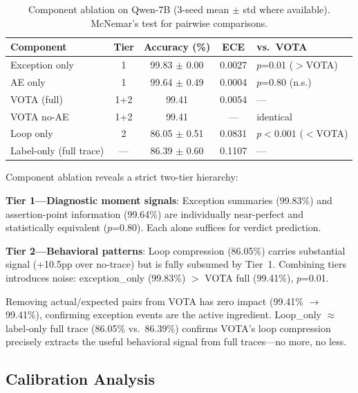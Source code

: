 \documentclass[11pt]{article}
\begin{document}
\begin{table}[h]
\centering
\caption{Component ablation on Qwen-7B (3-seed mean $\pm$ std where available). McNemar's test for pairwise comparisons.}
\label{tab:ablation}
\small
\begin{tabular}{lcccl}
\toprule
\textbf{Component} & \textbf{Tier} & \textbf{Accuracy (\%)} & \textbf{ECE} & \textbf{vs.\ VOTA} \\
\midrule
Exception only & 1 & 99.83 $\pm$ 0.00 & 0.0027 & $p$=0.01 ($>$VOTA) \\
AE only & 1 & 99.64 $\pm$ 0.49 & 0.0004 & $p$=0.80 (n.s.) \\
VOTA (full) & 1+2 & 99.41 & 0.0054 & --- \\
VOTA no-AE & 1+2 & 99.41 & --- & identical \\
Loop only & 2 & 86.05 $\pm$ 0.51 & 0.0831 & $p < 0.001$ ($<$VOTA) \\
Label-only (full trace) & --- & 86.39 $\pm$ 0.60 & 0.1107 & --- \\
\bottomrule
\end{tabular}
\end{table}

Component ablation reveals a strict two-tier hierarchy:

\textbf{Tier 1---Diagnostic moment signals}: Exception summaries (99.83\%) and assertion-point information (99.64\%) are individually near-perfect and statistically equivalent ($p$=0.80). Each alone suffices for verdict prediction.

\textbf{Tier 2---Behavioral patterns}: Loop compression (86.05\%) carries substantial signal (+10.5pp over no-trace) but is fully subsumed by Tier~1. Combining tiers introduces noise: exception\_only (99.83\%) $>$ VOTA full (99.41\%), $p$=0.01.

Removing actual/expected pairs from VOTA has zero impact (99.41\% $\rightarrow$ 99.41\%), confirming exception events are the active ingredient. Loop\_only $\approx$ label-only full trace (86.05\% vs.\ 86.39\%) confirms VOTA's loop compression precisely extracts the useful behavioral signal from full traces---no more, no less.

\subsection{Calibration Analysis}
\end{document}

